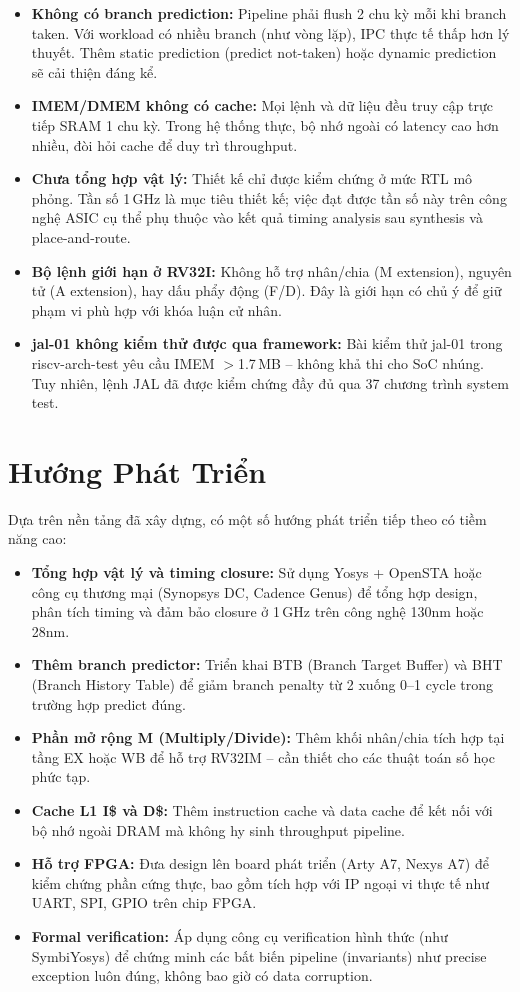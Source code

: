 \begin{itemize}
    \item \textbf{Không có branch prediction:} Pipeline phải flush 2 chu kỳ mỗi khi branch taken. Với workload có nhiều branch (như vòng lặp), IPC thực tế thấp hơn lý thuyết. Thêm static prediction (predict not-taken) hoặc dynamic prediction sẽ cải thiện đáng kể.
    \item \textbf{IMEM/DMEM không có cache:} Mọi lệnh và dữ liệu đều truy cập trực tiếp SRAM 1 chu kỳ. Trong hệ thống thực, bộ nhớ ngoài có latency cao hơn nhiều, đòi hỏi cache để duy trì throughput.
    \item \textbf{Chưa tổng hợp vật lý:} Thiết kế chỉ được kiểm chứng ở mức RTL mô phỏng. Tần số 1\,GHz là mục tiêu thiết kế; việc đạt được tần số này trên công nghệ ASIC cụ thể phụ thuộc vào kết quả timing analysis sau synthesis và place-and-route.
    \item \textbf{Bộ lệnh giới hạn ở RV32I:} Không hỗ trợ nhân/chia (M extension), nguyên tử (A extension), hay dấu phẩy động (F/D). Đây là giới hạn có chủ ý để giữ phạm vi phù hợp với khóa luận cử nhân.
    \item \textbf{jal-01 không kiểm thử được qua framework:} Bài kiểm thử jal-01 trong riscv-arch-test yêu cầu IMEM $>$1.7\,MB -- không khả thi cho SoC nhúng. Tuy nhiên, lệnh JAL đã được kiểm chứng đầy đủ qua 37 chương trình system test.
\end{itemize}

\section{Hướng Phát Triển}

Dựa trên nền tảng đã xây dựng, có một số hướng phát triển tiếp theo có tiềm năng cao:

\begin{itemize}
    \item \textbf{Tổng hợp vật lý và timing closure:} Sử dụng Yosys + OpenSTA hoặc công cụ thương mại (Synopsys DC, Cadence Genus) để tổng hợp design, phân tích timing và đảm bảo closure ở 1\,GHz trên công nghệ 130nm hoặc 28nm.
    \item \textbf{Thêm branch predictor:} Triển khai BTB (Branch Target Buffer) và BHT (Branch History Table) để giảm branch penalty từ 2 xuống 0--1 cycle trong trường hợp predict đúng.
    \item \textbf{Phần mở rộng M (Multiply/Divide):} Thêm khối nhân/chia tích hợp tại tầng EX hoặc WB để hỗ trợ RV32IM -- cần thiết cho các thuật toán số học phức tạp.
    \item \textbf{Cache L1 I\$ và D\$:} Thêm instruction cache và data cache để kết nối với bộ nhớ ngoài DRAM mà không hy sinh throughput pipeline.
    \item \textbf{Hỗ trợ FPGA:} Đưa design lên board phát triển (Arty A7, Nexys A7) để kiểm chứng phần cứng thực, bao gồm tích hợp với IP ngoại vi thực tế như UART, SPI, GPIO trên chip FPGA.
    \item \textbf{Formal verification:} Áp dụng công cụ verification hình thức (như SymbiYosys) để chứng minh các bất biến pipeline (invariants) như precise exception luôn đúng, không bao giờ có data corruption.
\end{itemize}
